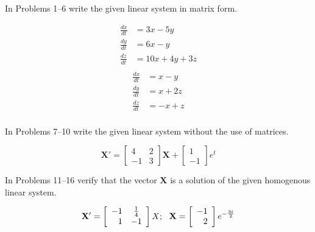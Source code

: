 \documentclass[chapter=8,section=1]{math252homework}
\begin{document}
In Problems 1--6 write the given linear system in matrix form.
\begin{problems}[start=3]
	\problem \begin{equation*}
	\begin{aligned}
		\frac{dx}{dt} &= 3x - 5y\\
		\frac{dy}{dt} &= 6x - y\\
		\frac{dz}{dt} &= 10x + 4y + 3z\\
	\end{aligned}
	\end{equation*}		%
	\problem \begin{equation*}
	\begin{aligned}
		\frac{dx}{dt} &= x - y\\
		\frac{dy}{dt} &= x + 2z\\
		\frac{dz}{dt} &= -x + z\\
	\end{aligned}
	\end{equation*}			%
\end{problems}

In Problems 7--10 write the given linear system without the use of matrices.
\begin{problems}[start=7]
	\problem \[ \mathbf{X}' = \left[ \begin{array}{rc}
		4 & 2\\
		-1 & 3
	\end{array} \right]\mathbf{X} + \left[ \begin{array}{r}
		1\\
		-1
	\end{array} \right] e^{t} \]			%
\end{problems}

In Problems 11--16 verify that the vector $\mathbf{X}$ is a solution of the given homogenous linear system.
\begin{problems}[start=13]
	\problem \[ \mathbf{X'} = \left[ \begin{array}{rc}
		-1 & \frac{1}{4}\\
		1 & -1\\
	\end{array} \right]X;\mbox{{ }{ }} \mathbf{X} = \left[ \begin{array}{r}
		-1\\
		2
	\end{array} \right]e^{-\frac{3t}{2}} \]			%
\end{problems}
\end{document}
